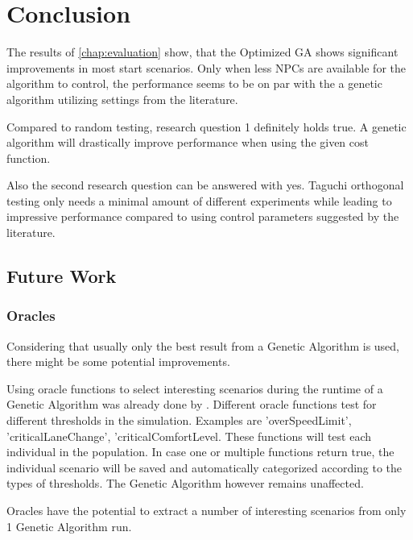 \chapter{Conclusion}

The results of \ref{chap:evaluation} show, that the Optimized GA shows significant improvements in most start scenarios. Only when less NPCs are available for the algorithm to control, the performance seems to be on par with the a genetic algorithm utilizing settings from the literature.

Compared to random testing, research question 1 definitely holds true. A genetic algorithm will drastically improve performance when using the given cost function.

Also the second research question can be answered with yes. Taguchi orthogonal testing only needs a minimal amount of different experiments while leading to impressive performance compared to using control parameters suggested by the literature.

\section{Future Work}
\subsection{Oracles}
Considering that usually only the best result from a Genetic Algorithm is used, there might be some potential improvements.

Using oracle functions to select interesting scenarios during the runtime of a Genetic Algorithm was already done by \cite{almanee_scenorita_2021}. Different oracle functions test for different thresholds in the simulation. Examples are 'overSpeedLimit', 'criticalLaneChange', 'criticalComfortLevel. These functions will test each individual in the population. In case one or multiple functions return true, the individual scenario will be saved and automatically categorized according to the types of thresholds. The Genetic Algorithm however remains unaffected.

Oracles have the potential to extract a number of interesting scenarios from only 1 Genetic Algorithm run.